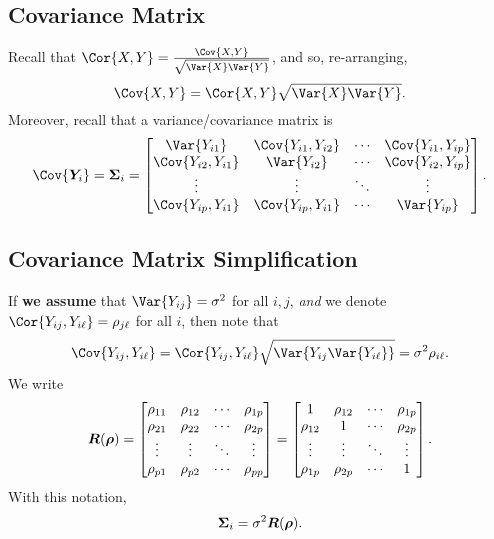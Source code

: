 \subsection*{Covariance Matrix}
Recall that $ \Cor{X,Y}=\frac{\Cov{X,Y}}{\sqrt{\Var{X}\Var{Y}}} $,
and so, re-arranging,
\[ \Cov{X,Y}=\Cor{X,Y}\sqrt{\Var{X}\Var{Y}}.\]
Moreover, recall that a variance/covariance matrix is
\[ \Cov{\Matrix{Y}_i}=
    \Matrix{\Sigma}_i=
    \begin{bmatrix}
        \Var{Y_{i1}}        & \Cov{Y_{i1},Y_{i2}} & \cdots & \Cov{Y_{i1},Y_{ip}} \\
        \Cov{Y_{i2},Y_{i1}} & \Var{Y_{i2}}        & \cdots & \Cov{Y_{i2},Y_{ip}} \\
        \vdots              & \vdots              & \ddots & \vdots              \\
        \Cov{Y_{ip},Y_{i1}} & \Cov{Y_{ip},Y_{i1}} & \cdots & \Var{Y_{ip}}
    \end{bmatrix}. \]
\subsection*{Covariance Matrix Simplification}
If \textbf{we assume} that $ \Var{Y_{ij}}=\sigma^2 $
for all $ i, j $, \emph{and} we denote $ \Cor{Y_{ij},Y_{i\ell}}=\rho_{j\ell} $
for all $ i $, then note that
\[ \Cov{Y_{ij},Y_{i\ell}}=\Cor{Y_{ij},Y_{i\ell}}\sqrt{\Var{Y_{ij}\Var{Y_{i\ell}}}}=\sigma^2\rho_{i\ell}. \]
We write
\[ \bm{R}(\bm{\rho})=\begin{bmatrix}
        \rho_{11}  & \rho_{12}  & \cdots & \rho_{1 p} \\
        \rho_{21}  & \rho_{22}  & \cdots & \rho_{2 p} \\
        \vdots     & \vdots     & \ddots & \vdots     \\
        \rho_{p 1} & \rho_{p 2} & \cdots & \rho_{p p}
    \end{bmatrix}=\begin{bmatrix}
        1          & \rho_{12}  & \cdots & \rho_{1 p} \\
        \rho_{12}  & 1          & \cdots & \rho_{2 p} \\
        \vdots     & \vdots     & \ddots & \vdots     \\
        \rho_{1 p} & \rho_{2 p} & \cdots & 1
    \end{bmatrix}. \]
With this notation,
\[ \bm{\Sigma}_i=\sigma^2\bm{R}(\bm{\rho}). \]
